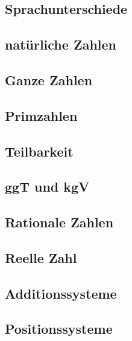 \subsection{Sprachunterschiede}\label{subsec:zahlen_sprachunterschiede}


\subsection{natürliche Zahlen}\label{subsec:zahlen_naturliche-zahlen}


\subsection{Ganze Zahlen}\label{subsec:zahlen_ganze-zahlen}


\subsection{Primzahlen}\label{subsec:zahlen_primzahlen}


\subsection{Teilbarkeit}\label{subsec:zahlen_teilbarkeit}


\subsection{ggT und kgV}\label{subsec:zahlen_ggt-und-kgv}


\subsection{Rationale Zahlen}\label{subsec:zahlen_rationale-zahlen}


\subsection{Reelle Zahl}\label{subsec:zahlen_reelle-zahl}


\subsection{Additionssysteme}\label{subsec:zahlen_additionssysteme}


\subsection{Positionssysteme}\label{subsec:zahlen_positionssysteme}


